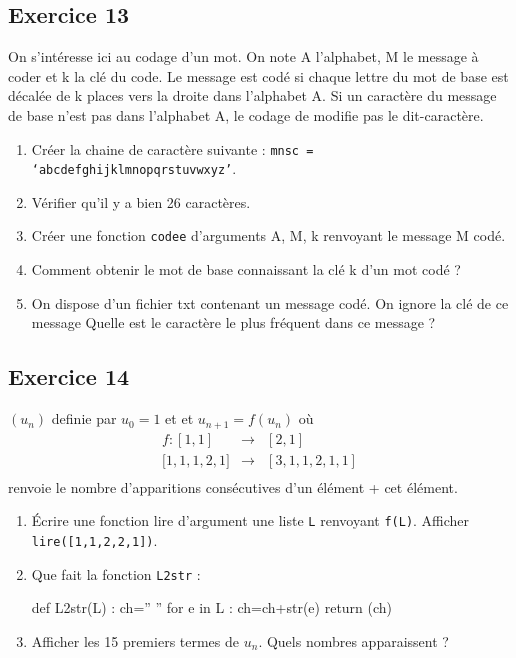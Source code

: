 \documentclass[10pt,fleqn]{article} %
\begin{document}
\begin{multicols}{2}
\subsection*{Exercice 13}

On s’intéresse ici au codage d’un mot. On note A l’alphabet, M le message à coder et k la clé du code. Le message est codé si chaque lettre du mot de base est décalée de k places vers la droite dans l’alphabet A.
Si un caractère du message de base n’est pas dans l’alphabet A, le codage de modifie pas le dit-caractère.

\begin{enumerate}
\item Créer la chaine de caractère suivante : \texttt{mnsc = ‘abcdefghijklmnopqrstuvwxyz’}.
\item Vérifier qu’il y a bien 26 caractères.
\item Créer une fonction \texttt{codee} d’arguments A, M, k renvoyant le message M codé.
\item Comment obtenir le mot de base connaissant la clé k d’un mot codé ?
\item On dispose d’un fichier txt contenant un message codé. On ignore la clé de ce message
Quelle est le caractère le plus fréquent dans ce message ?
\end{enumerate}

\subsection*{Exercice 14}
$(u_n)$ definie par $u_0=1$ et et $u_{n+1}= f(u_n)$ où 
$$
\begin{array}{rcl}
f : [1,1] & \rightarrow  & [2,1] \\
\big[  1,1,1,2,1 \big]  & \rightarrow &  [3,1,1,2,1,1] \\
\end{array}
$$
renvoie le nombre d'apparitions consécutives d'un élément + cet élément.
\begin{enumerate}
\item Écrire une fonction lire d'argument une liste \texttt{L} renvoyant \texttt{f(L)}. Afficher \texttt{lire([1,1,2,2,1])}.
\item Que fait la fonction \texttt{L2str} :
\begin{python}
def  L2str(L) :
    ch='' ''
    for e in L :
        ch=ch+str(e)
    return (ch)
\end{python}
\item Afficher les 15 premiers termes de $u_n$. Quels nombres apparaissent ?
\end{enumerate}



\end{multicols}
\end{document}
